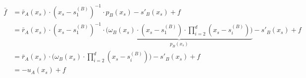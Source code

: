 \begin{align}\label{equation:pass-ver-OPA}
\begin{split}
\bar{f}&= \bar{r}_{\scriptscriptstyle A}(x_{\scriptscriptstyle s})\cdot (x_{\scriptscriptstyle s}-s^{\scriptscriptstyle(B)}_{\scriptscriptstyle 1})^{\scriptscriptstyle -1}\cdot p_{\scriptscriptstyle B}(x_{\scriptscriptstyle s})-s'_{\scriptscriptstyle B}(x_{\scriptscriptstyle s})+f\\
&=\bar{r}_{\scriptscriptstyle A}(x_{\scriptscriptstyle s})\cdot (x_{\scriptscriptstyle s}-s^{\scriptscriptstyle(B)}_{\scriptscriptstyle 1})^{\scriptscriptstyle -1}\cdot    \underbrace{\Big(\omega_{\scriptscriptstyle B}(x_{\scriptscriptstyle s})\cdot (x_{\scriptscriptstyle s}-s^{\scriptscriptstyle(B)}_{\scriptscriptstyle 1})\cdot \prod\limits^{\scriptscriptstyle d}_{\scriptscriptstyle i=2}(x_{\scriptscriptstyle s}-s^{\scriptscriptstyle(B)}_{\scriptscriptstyle i})\Big)}_{p_{\scriptscriptstyle B}(x_{s})}-s'_{\scriptscriptstyle B}(x_{\scriptscriptstyle s})+f\\
&=\bar{r}_{\scriptscriptstyle A}(x_{\scriptscriptstyle s})\cdot   \Big(\omega_{\scriptscriptstyle B}(x_{\scriptscriptstyle s})\cdot  \prod\limits^{\scriptscriptstyle d}_{\scriptscriptstyle i=2}(x_{\scriptscriptstyle s}-s^{\scriptscriptstyle(B)}_{\scriptscriptstyle i})\Big)-s'_{\scriptscriptstyle B}(x_{\scriptscriptstyle s})+f\\
&=-u_{\scriptscriptstyle A}(x_{\scriptscriptstyle s})+f
 \end{split}
 \end{align}

  
